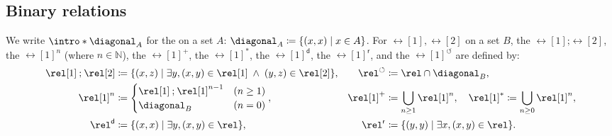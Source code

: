 \documentclass[a4paper,UKenglish,cleveref, autoref, thm-restate]{lipics-v2021}
\DeclarePairedDelimiter\set{\{}{\}}
\DeclarePairedDelimiter\tuple{(}{)}
\newcommand{\defeq}{\coloneq}
\newcommand{\nat}{\mathbb{N}}
\newcommand{\compo}{\mathbin{;}}
\newcommand{\dom}{\mathsf{d}}
\newcommand{\rng}{\mathsf{r}}
\newcommand{\lop}{\circlearrowleft}
\begin{document}
\subsection{Binary relations}
\AP
We write $\intro*\diagonal_{A}$ for the \intro*{} on a set $A$: $\diagonal_{A} \defeq \set{\tuple{x, x} \mid x \in A}$.
\AP
For \intro*{} $\rel[1], \rel[2]$ on a set $B$, the \intro*{} $\rel[1] \compo \rel[2]$, the \AP
    \intro*{} $\rel[1]^{n}$ (where $n \in \nat$), the \intro*{} $\rel[1]^{+}$, the \intro*{} $\rel[1]^*$,
    the \intro*{} $\rel[1]^{\dom}$,
the \intro*{} $\rel[1]^{\rng}$, and 
the \intro*{} $\rel[1]^{\lop}$
are defined by:
\begin{align*}
    \rel[1] \compo \rel[2] & \defeq \set{\tuple{x, z} \mid \exists y, \tuple{x, y} \in \rel[1] \;\land\;  \tuple{y, z} \in \rel[2]}, &
    \rel^{\lop} &\defeq \rel \cap \diagonal_{B}, \\
    \rel[1]^n             & \defeq \begin{cases}
                                       \rel[1] \compo \rel[1]^{n-1} & (n \ge 1) \\
                                       \diagonal_{B}               & (n = 0)
                                   \end{cases}, &
    \rel[1]^{+}        & \defeq \bigcup_{n \ge 1} \rel[1]^n, \quad
    \rel[1]^*  \defeq \bigcup_{n \ge 0} \rel[1]^n,\\
    \rel^{\dom} &\defeq \set{\tuple{x, x} \mid \exists y, \tuple{x, y} \in \rel}, & 
    \rel^{\rng} &\defeq \set{\tuple{y, y} \mid \exists x, \tuple{x, y} \in \rel}. 
\end{align*}
\end{document}

